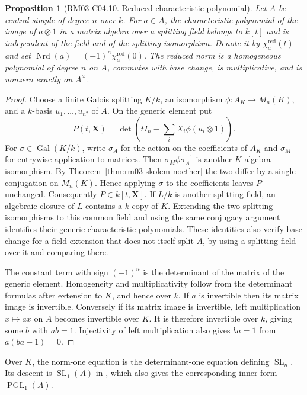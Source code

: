 \documentclass[11pt,oneside,openany]{book}
\newtheorem{proposition}[theorem]{Proposition}
\theoremstyle{definition}
\theoremstyle{remark}
\begin{document}
\begin{proposition}[RM03-C04.10. Reduced characteristic polynomial]
\label{prop:rm03-reduced-norm}
Let \(A\) be central simple of degree \(n\) over \(k\).
For \(a\in A\), the characteristic polynomial of the image of
\(a\otimes 1\) in a matrix algebra over a splitting field belongs
to \(k[t]\) and is independent of the field and of the splitting
isomorphism. Denote it by \(\chi_a^{\mathrm{red}}(t)\) and set
\(\operatorname{Nrd}(a)=(-1)^n\chi_a^{\mathrm{red}}(0)\).
The reduced norm is a homogeneous polynomial of degree \(n\)
on \(A\), commutes with base change, is multiplicative, and
is nonzero exactly on \(A^\times\).
\end{proposition}
\begin{proof}
Choose a finite Galois splitting \(K/k\), an isomorphism
\(\phi:A_K\to M_n(K)\), and a \(k\)-basis \(u_1,\ldots,u_{n^2}\)
of \(A\). On the generic element put
\[
 P(t,\mathbf X)=
 \det\left(tI_n-\sum_i X_i\phi(u_i\otimes 1)\right).
\]
For \(\sigma\in\operatorname{Gal}(K/k)\), write \(\sigma_A\)
for the action on the coefficients of \(A_K\) and \(\sigma_M\)
for entrywise application to matrices. Then
\(\sigma_M\phi\sigma_A^{-1}\) is another \(K\)-algebra
isomorphism. By Theorem~\ref{thm:rm03-skolem-noether} the
two differ by a single conjugation on \(M_n(K)\). Hence
applying \(\sigma\) to the coefficients leaves \(P\) unchanged.
Consequently \(P\in k[t,\mathbf X]\). If \(L/k\) is another
splitting field, an algebraic closure of \(L\) contains a
\(k\)-copy of \(K\). Extending the two splitting isomorphisms
to this common field and using the same conjugacy argument
identifies their generic characteristic polynomials. These
identities also verify base change for a field extension
that does not itself split \(A\), by using a splitting field
over it and comparing there.

The constant term with sign \((-1)^n\) is the determinant
of the matrix of the generic element. Homogeneity and
multiplicativity follow from the determinant formulas after
extension to \(K\), and hence over \(k\). If \(a\) is invertible
then its matrix image is invertible. Conversely if its
matrix image is invertible, left multiplication \(x\mapsto ax\)
on \(A\) becomes invertible over \(K\). It is therefore
invertible over \(k\), giving some \(b\) with \(ab=1\).
Injectivity of left multiplication also gives \(ba=1\)
from \(a(ba-1)=0\).
\end{proof}

Over \(K\), the norm-one equation is the determinant-one
equation defining \(\operatorname{SL}_n\). Its descent is
\(\operatorname{SL}_1(A)\) in \cite[Result F05]{lag}, which
also gives the corresponding inner form \(\operatorname{PGL}_1(A)\).
\end{document}
